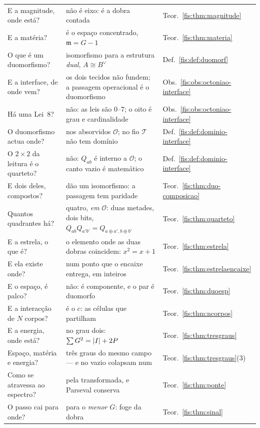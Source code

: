 \documentclass[livro.tex]{subfiles}
\begin{document}
{\begin{longtable}{@{}p{}p{}l@{}}
E a magnitude, onde está? & não é eixo: é a dobra contada & Teor.~\ref{fis:thm:magnitude} \\
E a matéria? & é o espaço concentrado, $\mathfrak{m}=G-1$ & Teor.~\ref{fis:thm:materia} \\
O que é um duomorfismo? & isomorfismo para a estrutura \emph{dual}, $A\cong B^{\vee}$ & Def.~\ref{fis:def:duomorf} \\
E a interface, de onde vem? & os dois tecidos não fundem; a passagem operacional é o duomorfismo & Obs.~\ref{fis:obs:octoniao-interface} \\
Há uma Lei~8? & não: as leis são $0$--$7$; o oito é grau e cardinalidade & Obs.~\ref{fis:obs:octoniao-interface} \\
O duomorfismo actua onde? & nos absorvidos $\mathcal{O}$; no fio $\mathcal{T}$ não tem domínio & Def.~\ref{fis:def:dominio-interface} \\
O $2{\times}2$ da leitura é o quarteto? & não: $Q_{ab}$ é interno a $\mathcal{O}$; o canto vazio é matemático & Def.~\ref{fis:def:dominio-interface} \\
E dois deles, compostos? & dão um isomorfismo: a passagem tem paridade & Teor.~\ref{fis:thm:duo-composicao} \\
Quantos quadrantes há? & quatro, \emph{em} $\mathcal{O}$: duas metades, dois bits, $Q_{ab}Q_{a'b'}=Q_{a\oplus a',b\oplus b'}$ & Teor.~\ref{fis:thm:quarteto} \\
E a estrela, o que é? & o elemento onde as duas dobras coincidem: $x^{2}=x+1$ & Teor.~\ref{fis:thm:estrela} \\
E ela existe onde? & num ponto que o encaixe entrega, em inteiros & Teor.~\ref{fis:thm:estrelaencaixe} \\
E o espaço, é palco? & não: é componente, e o par é duomorfo & Teor.~\ref{fis:thm:duoesp} \\
E a interacção de $N$ corpos? & é o $c$: as células que partilham & Teor.~\ref{fis:thm:ncorpos} \\
E a energia, onde está? & no grau dois: $\sum G^{2}=\lvert I\rvert+2P$ & Teor.~\ref{fis:thm:tresgraus} \\
Espaço, matéria e energia? & três graus do mesmo campo --- e no vazio colapsam num & Teor.~\ref{fis:thm:tresgraus}(3) \\
Como se atravessa ao espectro? & pela transformada, e Parseval conserva & Teor.~\ref{fis:thm:ponte} \\
O passo cai para onde? & para o \emph{menor} $G$: foge da dobra & Teor.~\ref{fis:thm:sinal} \\

\end{longtable}}
\end{document}
